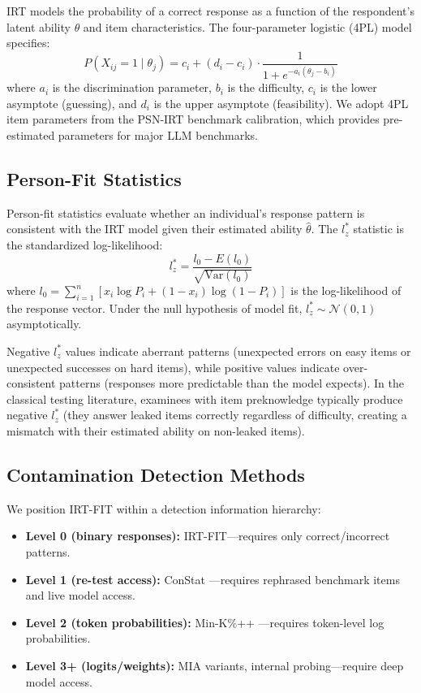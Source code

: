 \documentclass[11pt]{article}
\begin{document}
IRT models the probability of a correct response as a function of the respondent's latent ability $\theta$ and item characteristics.
The four-parameter logistic (4PL) model specifies:
\begin{equation}
    P(X_{ij} = 1 \mid \theta_j) = c_i + (d_i - c_i) \cdot \frac{1}{1 + e^{-a_i(\theta_j - b_i)}}
\end{equation}
where $a_i$ is the discrimination parameter, $b_i$ is the difficulty, $c_i$ is the lower asymptote (guessing), and $d_i$ is the upper asymptote (feasibility).
We adopt 4PL item parameters from the PSN-IRT benchmark calibration, which provides pre-estimated parameters for major LLM benchmarks.

\subsection{Person-Fit Statistics}

Person-fit statistics evaluate whether an individual's response pattern is consistent with the IRT model given their estimated ability $\hat{\theta}$.
The $l_z^*$ statistic \citep{snijders2001} is the standardized log-likelihood:
\begin{equation}
    l_z^* = \frac{l_0 - E(l_0)}{\sqrt{\text{Var}(l_0)}}
\end{equation}
where $l_0 = \sum_{i=1}^{n} [x_i \log P_i + (1-x_i) \log(1 - P_i)]$ is the log-likelihood of the response vector.
Under the null hypothesis of model fit, $l_z^* \sim \mathcal{N}(0, 1)$ asymptotically.

Negative $l_z^*$ values indicate aberrant patterns (unexpected errors on easy items or unexpected successes on hard items), while positive values indicate over-consistent patterns (responses more predictable than the model expects).
In the classical testing literature, examinees with item preknowledge typically produce negative $l_z^*$ (they answer leaked items correctly regardless of difficulty, creating a mismatch with their estimated ability on non-leaked items).

\subsection{Contamination Detection Methods}

We position IRT-FIT within a detection information hierarchy:
\begin{itemize}
    \item \textbf{Level 0 (binary responses):} IRT-FIT---requires only correct/incorrect patterns.
    \item \textbf{Level 1 (re-test access):} ConStat \citep{dekoninck2024constat}---requires rephrased benchmark items and live model access.
    \item \textbf{Level 2 (token probabilities):} Min-K\%++ \citep{shi2024minkpp}---requires token-level log probabilities.
    \item \textbf{Level 3+ (logits/weights):} MIA variants, internal probing---require deep model access.
\end{itemize}
\end{document}
